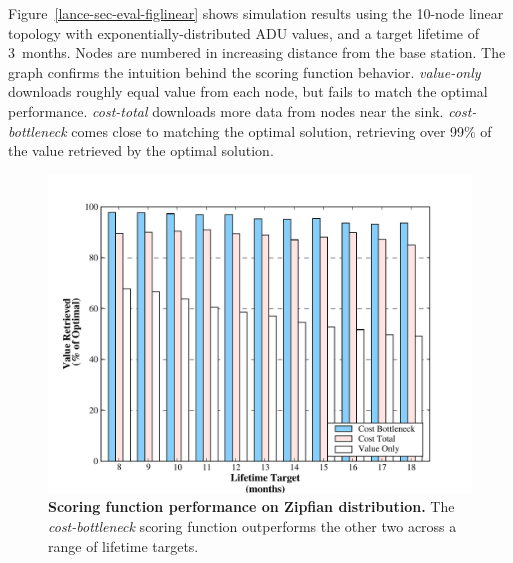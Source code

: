 Figure~\ref{lance-sec-eval-figlinear} shows simulation results using the
10-node linear topology with exponentially-distributed ADU values, and a
target lifetime of 3~months.  Nodes are numbered in increasing distance from
the base station.  The graph confirms the intuition behind the scoring
function behavior.  \emph{value-only} downloads roughly equal value from each
node, but fails to match the optimal performance. \emph{cost-total} downloads
more data from nodes near the sink.  \emph{cost-bottleneck} comes close to
matching the optimal solution, retrieving over 99\% of the value retrieved by
the optimal solution.

\begin{figure}[t]
\label{lance-sec-eval-zipfian}
\begin{center}
\includegraphics[width=1.0\hsize]{./6-lance/figs/gwa/zipfian/POLICIES.pdf}
\end{center}
\caption{\textbf{Scoring function performance on Zipfian distribution.}
The {\em cost-bottleneck} scoring function outperforms the other two across a
range of lifetime targets.}
\end{figure}

